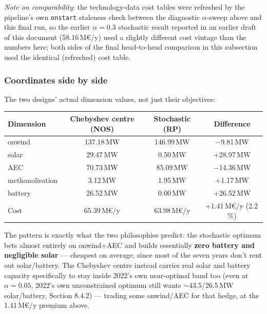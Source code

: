 \documentclass[11pt]{article}
\begin{document}
\emph{Note on comparability}: the technology-data cost tables were
refreshed by the pipeline's own \texttt{onstart} staleness check between
the diagnostic $\alpha$-sweep above and this final run, so the earlier
$\alpha=0.3$ stochastic result reported in an earlier draft of this
document (58.16\,M€/y) used a slightly different cost vintage than the
numbers here; both sides of the final head-to-head comparison in this
subsection used the identical (refreshed) cost table.

\subsubsection{Coordinates side by side}
\label{sec:decisive-coords}
The two designs' actual dimension values, not just their objectives:
\begin{center}
\small
\begin{tabular}{@{}lccc@{}}
\toprule
Dimension & Chebyshev centre (NOS) & Stochastic (RP) & Difference \\
\midrule
onwind           & 137.18\,MW & 146.99\,MW &  $-$9.81\,MW \\
solar            &  29.47\,MW &   0.50\,MW & $+$28.97\,MW \\
AEC              &  70.73\,MW &  85.09\,MW & $-$14.36\,MW \\
methanolisation  &   3.12\,MW &   1.95\,MW &  $+$1.17\,MW \\
battery          &  26.52\,MW &   0.00\,MW & $+$26.52\,MW \\
\midrule
Cost             & 65.39\,M€/y & 63.98\,M€/y & $+$1.41\,M€/y (2.2\,\%) \\
\bottomrule
\end{tabular}
\end{center}
The pattern is exactly what the two philosophies predict: the stochastic
optimum bets almost entirely on onwind+AEC and builds essentially
\textbf{zero battery and negligible solar} --- cheapest on average, since
most of the seven years don't rent out solar/battery. The Chebyshev centre
instead carries real solar and battery capacity specifically to stay
inside 2022's own near-optimal band too (even at $\alpha=0.05$, 2022's own
unconstrained optimum still wants $\sim$43.5/26.5\,MW solar/battery,
Section 8.4.2) --- trading some onwind/AEC for that hedge, at the
1.41\,M€/y premium above.
\end{document}
